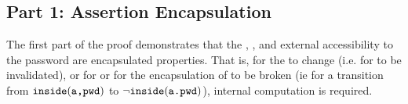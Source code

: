 

\subsection{Part 1: Assertion Encapsulation}
\label{s:BA-encap}
The first part of the proof demonstrates that the , , and external accessibility to the password are 
encapsulated properties. That is, for the  to change (i.e. for  to be invalidated), or for 
or for the encapsulation of  to be broken (ie for a transition from ${\texttt{inside}( {\texttt{a,pwd}} )}$ to $\neg {\texttt{inside}( {\texttt{a.pwd}} )}$),
internal computation is required. 

